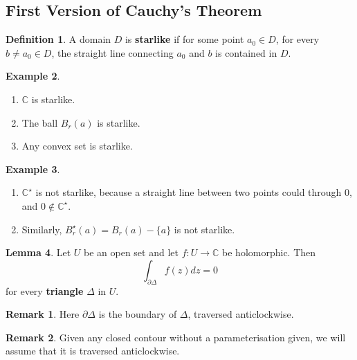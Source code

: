 \documentclass[12pt,a4paper]{article}
\theoremstyle{definition}
\newtheorem{definition}{Definition}[subsection]
\newtheorem{lemma}[definition]{Lemma}
\newtheorem{example}[definition]{Example}
\newtheorem*{remark}{Remark}
\begin{document}
\subsection{First Version of Cauchy's Theorem}

\begin{definition}
	A domain $D$ is \textbf{starlike} if for some point $a_0 \in D$, for every $b \ne a_0 \in D$, the straight line connecting $a_0$ and $b$ is contained in $D$.
\end{definition}

\begin{example}
	\hfill
	\begin{enumerate}
		\item $\mathbb{C}$ is starlike.
		\item The ball $B_r(a)$ is starlike.
		\item Any convex set is starlike.
	\end{enumerate}
\end{example}

\begin{example}
	\hfill
	\begin{enumerate}
		\item $\mathbb{C}^{\star}$ is not starlike, because a straight line between two points could through $0$, and $0 \notin \mathbb{C}^{\star}$.
		\item Similarly, $B_r^{\star}(a) = B_r(a) - \{ a \}$ is not starlike.
	\end{enumerate}
\end{example}

\begin{lemma}\label{lem:ctLem1}
	Let $U$ be an open set and let $f: U \rightarrow \mathbb{C}$ be holomorphic. Then
	\[
		\int_{\partial \Delta} f(z) dz = 0
	\]
	for every \textbf{triangle} $\Delta$ in $U$.
\end{lemma}

\begin{remark}
	Here $\partial \Delta$ is the boundary of $\Delta$, traversed anticlockwise.
\end{remark}

\begin{remark}
	Given any closed contour without a parameterisation given, we will assume that it is traversed anticlockwise.
\end{remark}
\end{document}
